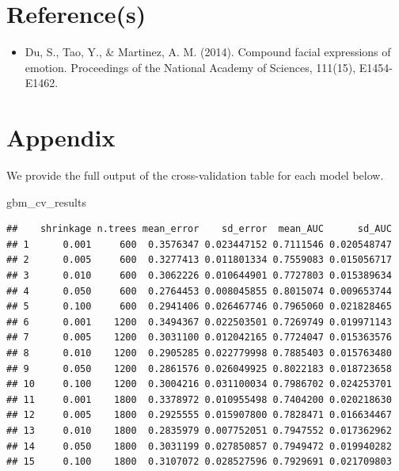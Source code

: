 \documentclass[
]{article}
\newenvironment{Shaded}{\begin{snugshade}}{\end{snugshade}}
\newcommand{\NormalTok}[1]{#1}
\providecommand{\tightlist}{%
  \setlength{\itemsep}{0pt}\setlength{\parskip}{0pt}}
\begin{document}
\newpage

\hypertarget{references}{%
\section{Reference(s)}\label{references}}

\begin{itemize}
\tightlist
\item
  Du, S., Tao, Y., \& Martinez, A. M. (2014). Compound facial
  expressions of emotion. Proceedings of the National Academy of
  Sciences, 111(15), E1454-E1462.
\end{itemize}

\hypertarget{appendix}{%
\section{Appendix}\label{appendix}}

We provide the full output of the cross-validation table for each model
below.

\begin{Shaded}
\begin{Highlighting}[]
\NormalTok{gbm_cv_results}
\end{Highlighting}
\end{Shaded}

\begin{verbatim}
##    shrinkage n.trees mean_error    sd_error  mean_AUC      sd_AUC
## 1      0.001     600  0.3576347 0.023447152 0.7111546 0.020548747
## 2      0.005     600  0.3277413 0.011801334 0.7559083 0.015056717
## 3      0.010     600  0.3062226 0.010644901 0.7727803 0.015389634
## 4      0.050     600  0.2764453 0.008045855 0.8015074 0.009653744
## 5      0.100     600  0.2941406 0.026467746 0.7965060 0.021828465
## 6      0.001    1200  0.3494367 0.022503501 0.7269749 0.019971143
## 7      0.005    1200  0.3031100 0.012042165 0.7724047 0.015363576
## 8      0.010    1200  0.2905285 0.022779998 0.7885403 0.015763480
## 9      0.050    1200  0.2861576 0.026049925 0.8022183 0.018723658
## 10     0.100    1200  0.3004216 0.031100034 0.7986702 0.024253701
## 11     0.001    1800  0.3378972 0.010955498 0.7404200 0.020218630
## 12     0.005    1800  0.2925555 0.015907800 0.7828471 0.016634467
## 13     0.010    1800  0.2835979 0.007752051 0.7947552 0.017362962
## 14     0.050    1800  0.3031199 0.027850857 0.7949472 0.019940282
## 15     0.100    1800  0.3107072 0.028527596 0.7929691 0.021709803
\end{verbatim}
\end{document}
